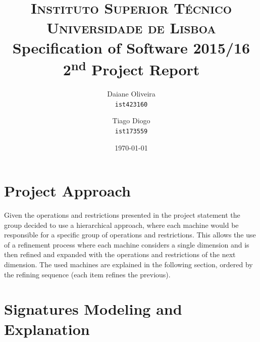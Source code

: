 \documentclass[paper=a4, fontsize=11pt]{scrartcl} %
\title{\vspace{-1.5cm}
\normalfont \normalsize 
\textsc{Instituto Superior Técnico\\Universidade de Lisboa} \\ [12pt] %
\huge Specification of Software 2015/16\\2\textsuperscript{nd} Project Report \\ [5pt]
}
\author{
  Daiane Oliveira\\
  \texttt{ist423160}
  \and
  Tiago Diogo\\
  \texttt{ist173559}
}
\date{\normalsize\today} %
\numberwithin{equation}{section} %
\numberwithin{figure}{section} %
\numberwithin{table}{section} %
\begin{document}
\maketitle %

\section{Project Approach}
Given the operations and restrictions presented in the project statement the group decided to use a hierarchical approach, where each machine would be responsible for a specific group of operations and restrictions. This allows the use of a refinement process where each machine considers a single dimension and is then refined and expanded with the operations and restrictions of the next dimension. The used machines are explained in the following section, ordered by the refining sequence (each item refines the previous).

\section{Signatures Modeling and Explanation}
\end{document}
